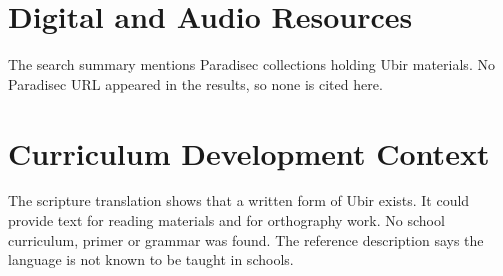 \documentclass[12pt]{article}
\begin{document}
\section{Digital and Audio Resources}
The search summary mentions Paradisec collections holding Ubir materials. No Paradisec URL appeared in the results, so none is cited here.

\section{Curriculum Development Context}
The scripture translation shows that a written form of Ubir exists. It could provide text for reading materials and for orthography work. No school curriculum, primer or grammar was found. The reference description says the language is not known to be taught in schools.
\end{document}
